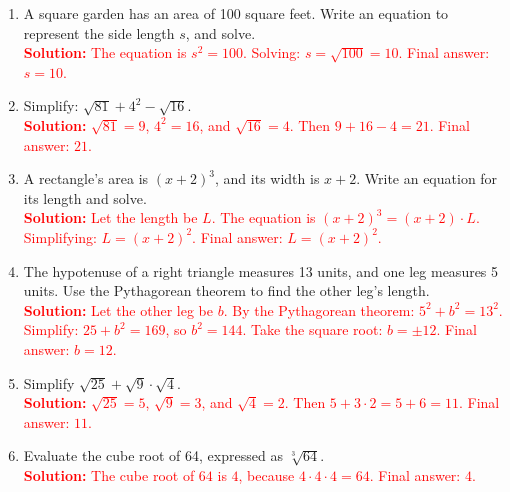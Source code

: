 \documentclass[10pt]{article}
\begin{document}
\begin{tcolorbox}[colframe=black!60, colback=white, 
coltitle=black, colbacktitle=black!15, fonttitle=\bfseries\Large, 
title=Problems, halign title=center, left=10pt, right=10pt, top=10pt, bottom=60pt]
\begin{enumerate}[itemsep=3em]
    \item A square garden has an area of 100 square feet. Write an equation to represent the side length \(s\), and solve.\\
    \textcolor{red}{\textbf{Solution:} The equation is \(s^2 = 100\). Solving: \(s = \sqrt{100} = 10\). Final answer: \(s = 10\).}

    \item Simplify: \( \sqrt{81} + 4^2 - \sqrt{16} \).\\
    \textcolor{red}{\textbf{Solution:} \( \sqrt{81} = 9\), \(4^2 = 16\), and \( \sqrt{16} = 4\). Then \(9 + 16 - 4 = 21\). Final answer: \(21\).}

    \item A rectangle's area is \((x+2)^3\), and its width is \(x+2\). Write an equation for its length and solve.\\
    \textcolor{red}{\textbf{Solution:} Let the length be \(L\). The equation is \((x+2)^3 = (x+2) \cdot L\). Simplifying: \(L = (x+2)^2\). Final answer: \(L = (x+2)^2\).}

    \item The hypotenuse of a right triangle measures 13 units, and one leg measures 5 units. Use the Pythagorean theorem to find the other leg's length.\\
    \textcolor{red}{\textbf{Solution:} Let the other leg be \(b\). By the Pythagorean theorem: \(5^2 + b^2 = 13^2\). Simplify: \(25 + b^2 = 169\), so \(b^2 = 144\). Take the square root: \(b = \pm 12\). Final answer: \(b = 12\).}

    \item Simplify \( \sqrt{25} + \sqrt{9} \cdot \sqrt{4} \).\\
    \textcolor{red}{\textbf{Solution:} \( \sqrt{25} = 5\), \( \sqrt{9} = 3\), and \( \sqrt{4} = 2\). Then \(5 + 3 \cdot 2 = 5 + 6 = 11\). Final answer: \(11\).}

    \item Evaluate the cube root of 64, expressed as \(\sqrt[3]{64}\).\\
    \textcolor{red}{\textbf{Solution:} The cube root of \(64\) is \(4\), because \(4 \cdot 4 \cdot 4 = 64\). Final answer: \(4\).}


\end{enumerate}
\end{tcolorbox}
\end{document}
